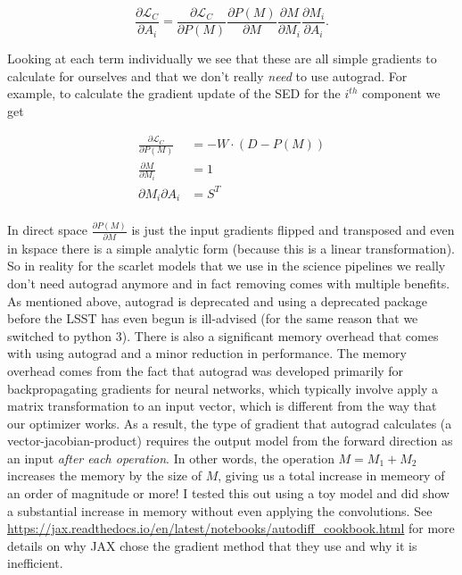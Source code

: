 \documentclass[DM,authoryear,toc]{lsstdoc}
\begin{document}
\begin{equation}
  \frac{\partial\mathcal{L}_C}{\partial A_i} = \frac{\partial\mathcal{L}_C}{\partial P(M)} \frac{\partial P(M)}{\partial M} \frac{\partial M}{\partial M_i} \frac{\partial M_i}{\partial A_i}. \label{eq:full_grad}
\end{equation}

Looking at each term individually we see that these are all simple gradients to calculate for ourselves and that we don't really \emph{need} to use autograd. For example, to calculate the gradient update of the SED for the $i^{th}$ component we get

\begin{align}
  \frac{\partial\mathcal{L}_C}{\partial P(M)} &= -W\cdot(D-P(M)) \\
  \frac{\partial M}{\partial M_i} &= 1 \\
  {\partial M_i}{\partial A_i} &= S^T \\
\end{align}

In direct space $\frac{\partial P(M)}{\partial M}$ is just the input gradients flipped and transposed and even in kspace there is a simple analytic form (because this is a linear transformation). So in reality for the scarlet models that we use in the science pipelines we really don't need autograd anymore and in fact removing comes with multiple benefits. As mentioned above, autograd is deprecated and using a deprecated package before the LSST has even begun is ill-advised (for the same reason that we switched to python 3). There is also a significant memory overhead that comes with using autograd and a minor reduction in performance. The memory overhead comes from the fact that autograd was developed primarily for backpropagating gradients for neural networks, which typically involve apply a matrix transformation to an input vector, which is different from the way that our optimizer works. As a result, the type of gradient that autograd calculates (a vector-jacobian-product) requires the output model from the forward direction as an input \emph{after each operation}. In other words, the operation $M = M_1 + M_2$ increases the memory by the size of $M$, giving us a total increase in memeory of an order of magnitude or more! I tested this out using a toy model and did show a substantial increase in memory without even applying the convolutions. See \url{https://jax.readthedocs.io/en/latest/notebooks/autodiff_cookbook.html} for more details on why JAX chose the gradient method that they use and why it is inefficient.
\end{document}
